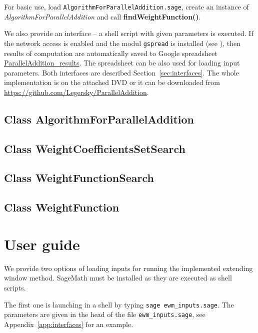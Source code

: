 For basic use, load \verb+AlgorithmForParallelAddition.sage+, create an instance of \emph{AlgorithmForParallelAddition} and call \textbf{findWeightFunction()}.

We also provide an interface -- a shell script with given parameters is executed. If the network access is enabled and the modul \verb+gspread+ is installed (see \cite{gspread}), then results of computation are automatically saved to Google spreadsheet \href{https://docs.google.com/spreadsheets/d/1TnhrHdefHfHa0WSeVs4q6XVj3epjPlPlnoekE0E1xeM/edit?usp=sharing}{ParallelAddition\_results}. The spreadsheet can be also used for loading input parameters. Both interfaces are described Section~\ref{sec:interfaces}. The whole implementation is on the attached DVD or it can be downloaded from  \url{https://github.com/Legersky/ParallelAddition}.



\subsection*{Class AlgorithmForParallelAddition}



\subsection*{Class WeightCoefficientsSetSearch}



\subsection*{Class WeightFunctionSearch}



\subsection*{Class WeightFunction}



\section{User guide}
We provide two options of loading inputs for running the implemented extending window method. SageMath must be installed as they are executed as shell scripts.

The first one is launching in a shell by typing \verb+sage ewm_inputs.sage+. The parameters are given in the head of the file \verb+ewm_inputs.sage+, see 
Appendix~\ref{app:interfaces} for an example.

